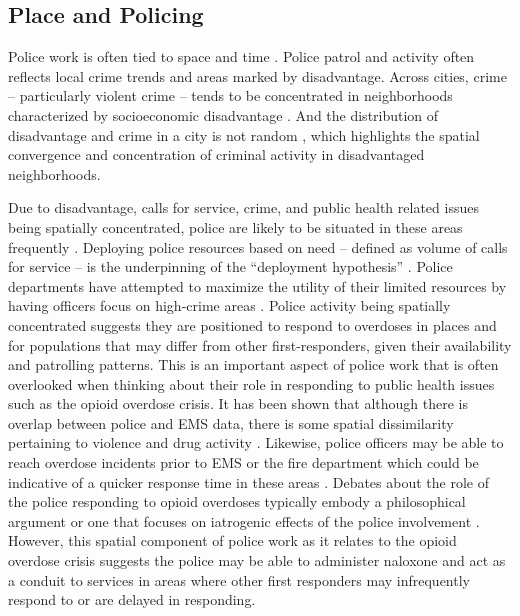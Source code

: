 \subsection{Place and Policing}

Police work is often tied to space and time \parencite{fyfe_police_1991}. Police patrol and activity often reflects local crime trends and areas marked by disadvantage. Across cities, crime – particularly violent crime – tends to be concentrated in neighborhoods characterized by socioeconomic disadvantage \parencite{peterson_divergent_2010}. And the distribution of disadvantage and crime in a city is not random \parencite{rothstein_color_2017, weisburd_law_2015}, which highlights the spatial convergence and concentration of criminal activity in disadvantaged neighborhoods.

Due to disadvantage, calls for service, crime, and public health related issues being spatially concentrated, police are likely to be situated in these areas frequently \parencite{engel_race_2012, mitchell_criminal_2011}. Deploying police resources based on need – defined as volume of calls for service – is the underpinning of the “deployment hypothesis” \parencite{alexander_war_2010, beckett_penal_2010}. Police departments have attempted to maximize the utility of their limited resources by having officers focus on high-crime areas \parencite{skogan_fairness_2004, weisburd_reforming_2003}. Police activity being spatially concentrated suggests they are positioned to respond to overdoses in places and for populations that may differ from other first-responders, given their availability and patrolling patterns. This is an important aspect of police work that is often overlooked when thinking about their role in responding to public health issues such as the opioid overdose crisis. It has been shown that although there is overlap between police and EMS data, there is some spatial dissimilarity pertaining to violence and drug activity \parencite{hibdon_concentration_2017, hibdon_going_2021}. Likewise, police officers may be able to reach overdose incidents prior to EMS or the fire department which could be indicative of a quicker response time in these areas \parencite{pourtaher_naloxone_2022, white_leveraging_2022}. Debates about the role of the police responding to opioid overdoses typically embody a philosophical argument or one that focuses on iatrogenic effects of the police involvement \parencite{doe-simkins_whose_2022, michaud_therapeutic_2023, van_der_meulen_thats_2021}. However, this spatial component of police work as it relates to the opioid overdose crisis suggests the police may be able to administer naloxone and act as a conduit to services in areas where other first responders may infrequently respond to or are delayed in responding. 

